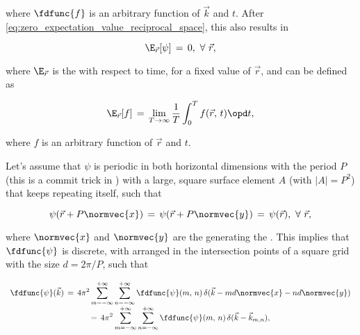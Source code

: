 {where $\fdfunc{f}$ is an arbitrary function of $\vec{k}$ and $t$. After  \eqref{eq:zero_expectation_value_reciprocal_space}, this also results in 

\begin{equation} \label{eq:zero_expectation_value_real_space_with_regard_to_t}
\E_{\vec{r}}[\psi] \,=\, 0,\ \forall\ \vec{r},
\end{equation}

where $\E_{\vec{r}}$ is the  with respect to time, for a fixed value of $\vec{r}$, and can be defined as

\begin{equation} \label{eq:expectation_value_real_space_with_regard_to_t_definition}
\E_{\vec{r}}[f] \,=\, \lim_{T\to\infty}\frac{1}{T}\int_0^T f(\vec{r},\,t)\opd t,
\end{equation}

where $f$ is an arbitrary function of $\vec{r}$ and $t$.

Let's assume that $\psi$ is periodic in both horizontal dimensions with the period $P$ (this is a commit trick in ) with a large, square surface element $A$ (with \mbox{$|A| = P^2$}) that keeps repeating itself, such that

\begin{equation} \label{eq:water_surface_periodicity}
\psi(\vec{r}+P\normvec{x}) \,=\, \psi(\vec{r}+P\normvec{y}) \,=\, \psi(\vec{r}),\ \forall\ \vec{r},
\end{equation}

where $\normvec{x}$ and $\normvec{y}$ are the  generating the . This implies that $\fdfunc{\psi}$ is discrete, with  arranged in the intersection points of a square grid with the size $d = 2\pi/P$, such that

\begin{equation} \label{eq:fd_eta_series}
\renewcommand*{\arraystretch}{2}
\begin{array}{c}
\displaystyle \fdfunc{\psi}(\vec{k}) \,=\, 4\pi^2\sum_{m=-\infty}^{+\infty}\sum_{n=-\infty}^{+\infty} \fdfunc{\psi}(m,\,n)\,\delta(\vec{k} - md\normvec{x} - nd\normvec{y}) \\
\displaystyle =\, 4\pi^2\sum_{m=-\infty}^{+\infty}\sum_{n=-\infty}^{+\infty} \fdfunc{\psi}(m,\,n)\,\delta(\vec{k} - \vec{k}_{m,n}),
\end{array}
\end{equation}

}
